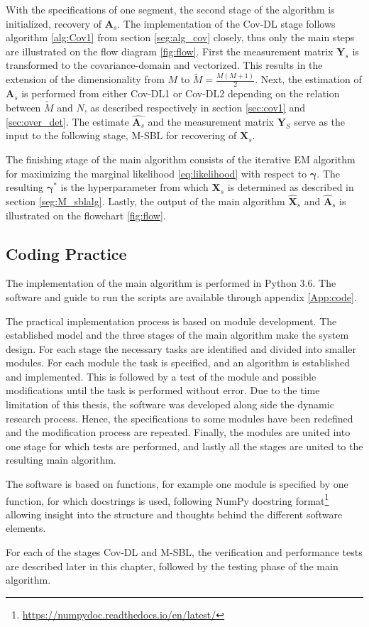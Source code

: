 With the specifications of one segment, the second stage of the algorithm is initialized, recovery of $\mathbf{A}_s$.
The implementation of the Cov-DL stage follows algorithm \ref{alg:Cov1} from section \ref{seg:alg_cov} closely, thus only the main steps are illustrated on the flow diagram \ref{fig:flow}.
First the measurement matrix $\mathbf{Y}_s$ is transformed to the covariance-domain and vectorized. This results in the extension of the dimensionality from $M$ to $\widetilde{M} = \frac{M(M+1)}{2}$.
Next, the estimation of $\mathbf{A}_s$ is performed from either Cov-DL1 or Cov-DL2 depending on the relation between $\widetilde{M}$ and $N$, as described respectively in section \ref{sec:cov1} and \ref{sec:over_det}.
The estimate $\hat{\mathbf{A}_s}$ and the measurement matrix $\mathbf{Y}_S$ serve as the input to the following stage, M-SBL for recovering of $\mathbf{X}_s$. 

The finishing stage of the main algorithm consists of the iterative EM algorithm for maximizing the marginal likelihood \eqref{eq:likelihood} with respect to $\boldsymbol{\gamma}$. The resulting $\boldsymbol{\gamma}^{\ast}$ is the hyperparameter from which $\mathbf{X}_s$ is determined as described in section \ref{seg:M_sblalg}. 
Lastly, the output of the main algorithm $\hat{\mathbf{X}}_s$ and $\hat{\mathbf{A}}_s$ is illustrated on the flowchart \ref{fig:flow}.

\subsection{Coding Practice}
The implementation of the main algorithm is performed in Python 3.6. The software and guide to run the scripts are available through appendix \ref{App:code}.

The practical implementation process is based on module development. 
The established model and the three stages of the main algorithm make the system design. 
For each stage the necessary tasks are identified and divided into smaller modules. 
For each module the task is specified, and an algorithm is established and implemented. 
This is followed by a test of the module and possible modifications until the task is performed without error. 
Due to the time limitation of this thesis, the software was developed along side the dynamic research process. 
Hence, the specifications to some modules have been redefined and the modification process are repeated. 
Finally, the modules are united into one stage for which tests are performed, and lastly all the stages are united to the resulting main algorithm.

The software is based on functions, for example one module is specified by one function, for which docstrings is used, following NumPy docstring format\footnote{\url{https://numpydoc.readthedocs.io/en/latest/}} allowing insight into the structure and thoughts behind the different software elements.

For each of the stages Cov-DL and M-SBL,  the verification and performance tests are described later in this chapter, followed by the testing phase of the main algorithm. 
